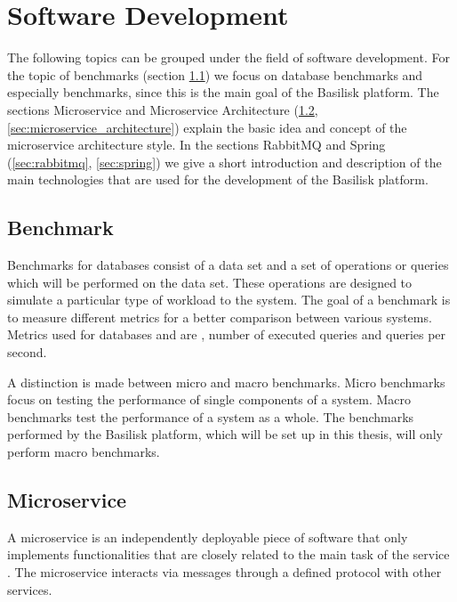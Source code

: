 


\section{Software Development}
The following topics can be grouped under the field of software development.
For the topic of benchmarks (section \ref{sec:benchmark}) we focus on database benchmarks and especially \ts{} benchmarks, since this is the main goal of the Basilisk platform.
The sections Microservice and Microservice Architecture (\ref{sec:microservice}, \ref{sec:microservice_architecture}) explain the basic idea and concept of the microservice architecture style.
In the sections RabbitMQ and Spring (\ref{sec:rabbitmq}, \ref{sec:spring}) we give a short introduction and description of the main technologies that are used for the development of the Basilisk platform.

\subsection{Benchmark}
\label{sec:benchmark}
Benchmarks for databases consist of a data set and a set of operations or queries which will be performed on the data set.
These operations are designed to simulate a particular type of workload to the system.
The goal of a benchmark is to measure different metrics for a better comparison between various systems.
Metrics used for databases and \tsp{} are \eg, number of executed queries and queries per second\cite{MetricsIguanaDocumentation}.

A distinction is made between micro and macro benchmarks.
Micro benchmarks focus on testing the performance of single components of a system.
Macro benchmarks test the performance of a system as a whole.
The benchmarks performed by the Basilisk platform, which will be set up in this thesis, will only perform macro benchmarks.

\subsection{Microservice}
\label{sec:microservice}
A microservice is an independently deployable piece of software that only implements functionalities that are closely related to the main task of the service \cite{dragoniMicroservicesYesterdayToday2017}.
The microservice interacts via messages through a defined protocol with other services.

